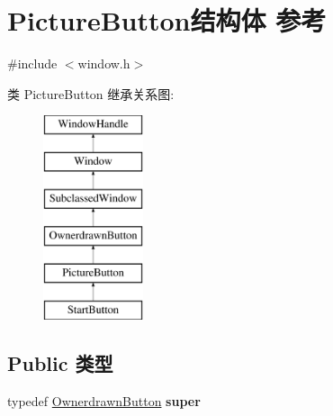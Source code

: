 \hypertarget{struct_picture_button}{}\section{Picture\+Button结构体 参考}
\label{struct_picture_button}


{\ttfamily \#include $<$window.\+h$>$}

类 Picture\+Button 继承关系图\+:\begin{figure}[H]
\begin{center}
\leavevmode
\includegraphics[height=6.000000cm]{struct_picture_button}
\end{center}
\end{figure}
\subsection*{Public 类型}
\begin{DoxyCompactItemize}
\item 
\mbox{\label{struct_picture_button_a307e87cc74abca8784c19a25c65bf1ba}} 
typedef \hyperlink{struct_ownerdrawn_button}{Ownerdrawn\+Button} {\bfseries super}
\end{DoxyCompactItemize}
